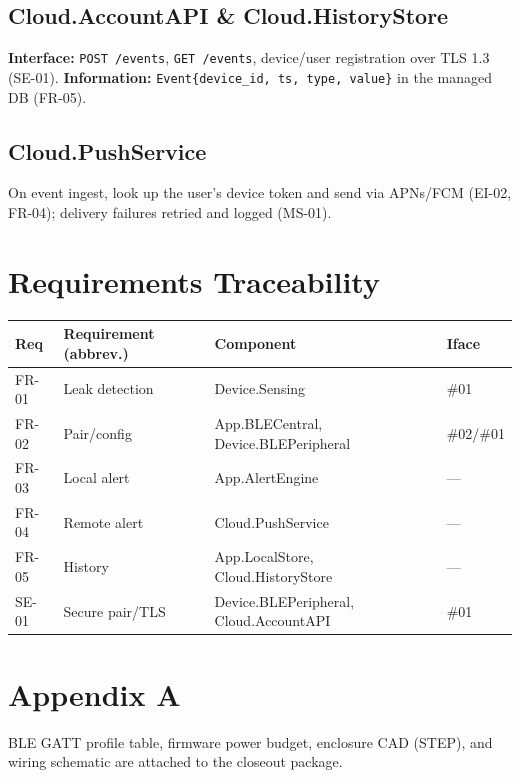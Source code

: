\documentclass[11pt,letterpaper]{article}
\begin{document}
\subsection{Cloud.AccountAPI \& Cloud.HistoryStore}
\textbf{Interface:} \texttt{POST /events}, \texttt{GET /events}, device/user
registration over TLS 1.3 (SE-01). \textbf{Information:}
\texttt{Event\{device\_id, ts, type, value\}} in the managed DB (FR-05).
\subsection{Cloud.PushService}
On event ingest, look up the user's device token and send via APNs/FCM (EI-02,
FR-04); delivery failures retried and logged (MS-01).

\section{Requirements Traceability}
\begin{table}[H]\begin{center}\begin{tabular}{ | p{1.6cm} | p{5cm} | p{3.4cm} | p{1.6cm} |}\hline
\textbf{Req} & \textbf{Requirement (abbrev.)} & \textbf{Component} & \textbf{Iface} \\ \hline
FR-01 & Leak detection & Device.Sensing & \#01 \\ \hline
FR-02 & Pair/config & App.BLECentral, Device.BLEPeripheral & \#02/\#01 \\ \hline
FR-03 & Local alert & App.AlertEngine & --- \\ \hline
FR-04 & Remote alert & Cloud.PushService & --- \\ \hline
FR-05 & History & App.LocalStore, Cloud.HistoryStore & --- \\ \hline
SE-01 & Secure pair/TLS & Device.BLEPeripheral, Cloud.AccountAPI & \#01 \\ \hline
\end{tabular}\end{center}\end{table}

\section{Appendix A}
BLE GATT profile table, firmware power budget, enclosure CAD (STEP), and wiring
schematic are attached to the closeout package.


{}
\end{document}
